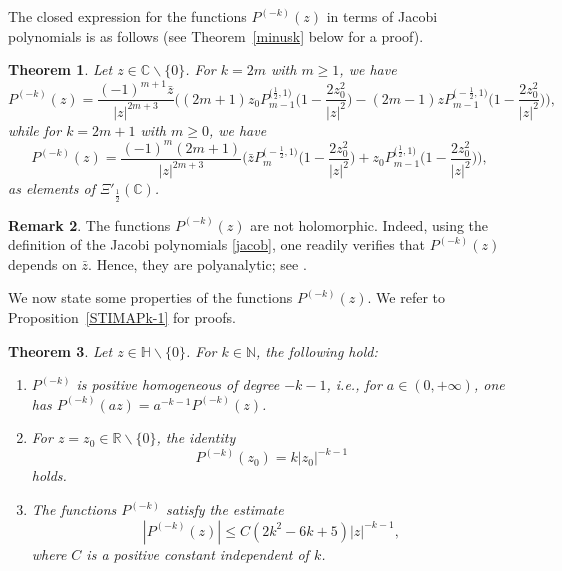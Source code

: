 \documentclass[reqno,11pt]{amsart}
\newtheorem{theorem}{Theorem}[section]
\theoremstyle{definition}
\newtheorem{remark}[theorem]{Remark}
\begin{document}
The closed expression for the functions $P^{(-k)}(z)$ in terms of Jacobi polynomials is as follows (see Theorem~\ref{minusk} below for a proof).
\begin{theorem}\label{minuskcomplex}
	Let $z \in \mathbb{C} \backslash \{0\}$. For $k=2m$ with $m \geq 1$, we have
	\begin{equation*}
		\label{secondpcomplex}
		P^{(-k)}(z)=\frac{ (-1)^{m+1}\bar{z}}{|z|^{2m+3}}\bigg((2m+1)z_0P_{m-1}^{\big(\frac{1}{2},1\big)}\bigg(1-\frac{2z_0^2}{|z|^2}\bigg)-(2m-1)zP_{m-1}^{\big(-\frac{1}{2},1\big)}\bigg(1-\frac{2z_0^2}{|z|^2}\bigg)\bigg),
	\end{equation*}
	while for $k=2m+1$ with $m \geq 0$, we have
	\begin{equation*}
		\label{threepcomplex}
		P^{(-k)}(z)= \frac{(-1)^m (2m+1)}{|z|^{2m+3}}\bigg(\bar{z}P_{m}^{\big(-\frac{1}{2},1\big)}\bigg(1-\frac{2z_0^2}{|z|^2}\bigg)+z_0P_{m-1}^{\big(\frac{1}{2},1\big)}\bigg(1-\frac{2z_0^2}{|z|^2}\bigg)\bigg),
	\end{equation*}
	as elements of $\Xi'_{\frac{1}{2}}(\mathbb{C})$.
\end{theorem}

\begin{remark}
	\label{REMnoholom}
The functions $P^{(-k)}(z)$ are not holomorphic. Indeed, using the definition of the Jacobi polynomials \eqref{jacob}, one readily verifies that $P^{(-k)}(z)$ depends on $\bar{z}$. Hence, they are polyanalytic; see \cite{Balk1}.
\end{remark}

We now state some properties of the functions $P^{(-k)}(z)$. We refer to Proposition~\ref{STIMAPk-1} for proofs.
\begin{theorem}
	Let $z \in \mathbb{H} \backslash \{0\}$. For $k \in \mathbb{N}$, the following hold:
	\begin{enumerate}[label=\textnormal{(\roman{*})}]
		\item $P^{(-k)}$ is positive homogeneous of degree $-k-1$, i.e., for $a\in (0,+\infty)$, one has $P^{(-k)}(az)=a^{-k-1}P^{(-k)}(z)$.
		\item For $z=z_0\in \mathbb{R}\backslash \{0\}$, the identity
		\[
		P^{(-k)}(z_0)= k |z_0|^{-k-1}
		\]
		holds.
		\item  The functions $P^{(-k)}$  satisfy the estimate
		\begin{equation}
			\label{est00complex}
			|P^{(-k)}(z)| \leq C (2k^2-6k+5)|z|^{-k-1},
		\end{equation}
		where $C$ is a positive constant independent of $k$.
	\end{enumerate}
\end{theorem}
\end{document}
